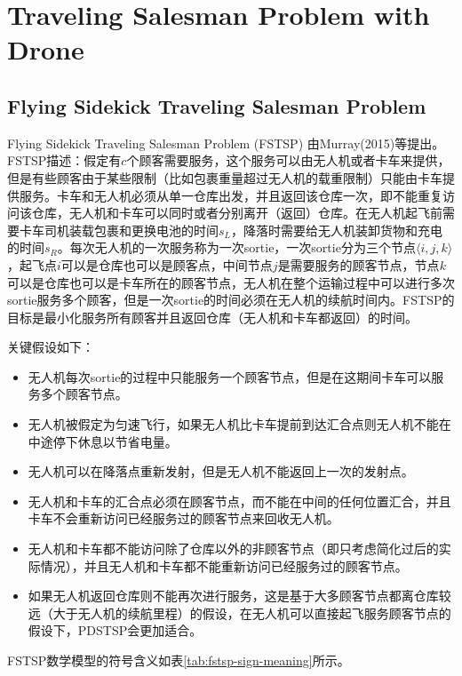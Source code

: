 \chapter{Traveling Salesman Problem with Drone}

\section{Flying Sidekick Traveling Salesman Problem}
Flying Sidekick Traveling Salesman Problem (FSTSP) 由Murray(2015)等\cite{murrayFlyingSidekickTraveling2015}提出。FSTSP描述：假定有$c$个顾客需要服务，这个服务可以由无人机或者卡车来提供，但是有些顾客由于某些限制（比如包裹重量超过无人机的载重限制）只能由卡车提供服务。卡车和无人机必须从单一仓库出发，并且返回该仓库一次，即不能重复访问该仓库，无人机和卡车可以同时或者分别离开（返回）仓库。在无人机起飞前需要卡车司机装载包裹和更换电池的时间$s_L$，降落时需要给无人机装卸货物和充电的时间$s_R$。每次无人机的一次服务称为一次sortie，一次sortie分为三个节点$\langle i,j,k \rangle$，起飞点$i$可以是仓库也可以是顾客点，中间节点$j$是需要服务的顾客节点，节点$k$可以是仓库也可以是卡车所在的顾客节点，无人机在整个运输过程中可以进行多次sortie服务多个顾客，但是一次sortie的时间必须在无人机的续航时间内。FSTSP的目标是最小化服务所有顾客并且返回仓库（无人机和卡车都返回）的时间。

关键假设如下：
\begin{itemize}
    \item 无人机每次sortie的过程中只能服务一个顾客节点，但是在这期间卡车可以服务多个顾客节点。
    \item 无人机被假定为匀速飞行，如果无人机比卡车提前到达汇合点则无人机不能在中途停下休息以节省电量。
    \item 无人机可以在降落点重新发射，但是无人机不能返回上一次的发射点。
    \item 无人机和卡车的汇合点必须在顾客节点，而不能在中间的任何位置汇合，并且卡车不会重新访问已经服务过的顾客节点来回收无人机。
    \item 无人机和卡车都不能访问除了仓库以外的非顾客节点（即只考虑简化过后的实际情况），并且无人机和卡车都不能重新访问已经服务过的顾客节点。
    \item 如果无人机返回仓库则不能再次进行服务，这是基于大多顾客节点都离仓库较远（大于无人机的续航里程）的假设，在无人机可以直接起飞服务顾客节点的假设下，PDSTSP会更加适合。
\end{itemize}

FSTSP数学模型的符号含义如表\ref{tab:fstsp-sign-meaning}所示。


